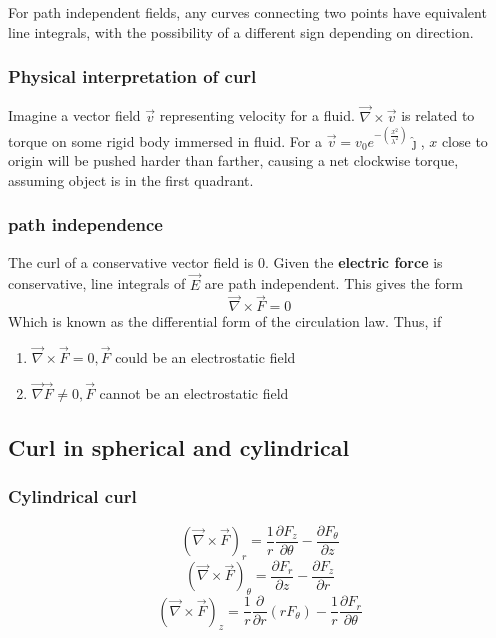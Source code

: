 For path independent fields, any curves connecting two points have equivalent line integrals, with the possibility of a different sign depending on direction.

\subsubsection{Physical interpretation of curl}
Imagine a vector field $ \vec{v} $ representing velocity for a fluid. $ \vec{\nabla}\times \vec{v} $ is related to torque on some rigid body immersed in fluid. For a $ \vec{v}=v_0e^{-(\frac{x^{2}}{\lambda^2})}\hat{\jmath} $, $ x $  close to origin will be pushed harder than farther, causing a net clockwise torque, assuming object is in the first quadrant.

\subsubsection{path independence}
The curl of a conservative vector field is $ 0 $. Given the \textbf{electric force} is conservative, line integrals of $ \vec{E} $ are path independent. This gives the form
\begin{equation}
	\vec{\nabla}\times \vec{F}=0
\end{equation}
Which is known as the differential form of the circulation law. Thus,
if
\begin{enumerate}
	\item $ \vec{\nabla} \times \vec{F}=0, \vec{F}$ could be an electrostatic field
	\item $ \vec{\nabla}\vec{F}\neq 0,\vec{F} $ cannot be an electrostatic field
\end{enumerate}

\subsection{Curl in spherical and cylindrical}
\subsubsection{Cylindrical curl}
\begin{equation}
	{(\vec{\nabla}\times \vec{F})}_{r}=\frac{1}{r}\frac{\partial F_{z}}{\partial\theta}-\frac{\partial F_{\theta}}{\partial z}
\end{equation}
\begin{equation}
	{(\vec{\nabla}\times \vec{F})}_{\theta}=\frac{\partial F_{r}}{\partial z}-\frac{\partial F_{z}}{\partial r}
\end{equation}
\begin{equation}
	{(\vec{\nabla}\times \vec{F})}_{z}=\frac{1}{r}\frac{\partial}{\partial r}(rF_{\theta})-\frac{1}{r}\frac{\partial F_{r}}{\partial\theta}
\end{equation}


